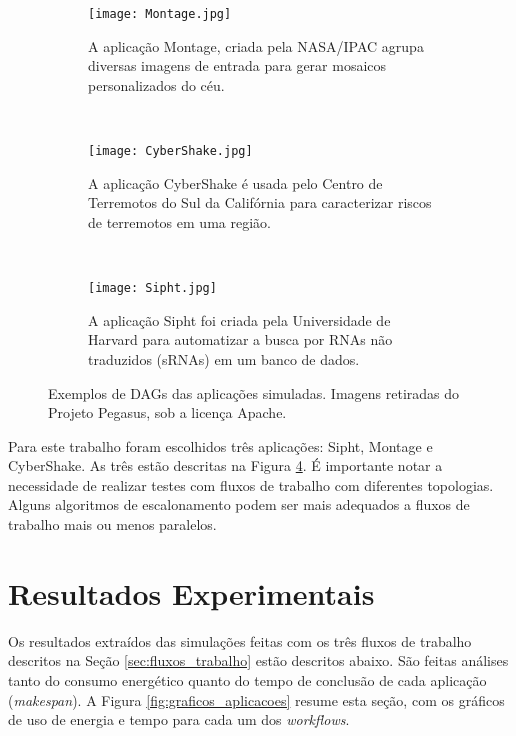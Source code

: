 \begin{figure}
        \centering
        \begin{subfigure}[b]{0.3\textwidth}
                \texttt{[image: Montage.jpg]}
                \caption{A aplicação Montage, criada pela NASA/IPAC agrupa
                diversas imagens de entrada para gerar mosaicos personalizados
                do céu.}
                \label{fig:montage}
        \end{subfigure}%
        ~ %
        \begin{subfigure}[b]{0.3\textwidth}
                \texttt{[image: CyberShake.jpg]}
                \caption{A aplicação CyberShake é usada pelo Centro de Terremotos
                do Sul da Califórnia para caracterizar riscos de terremotos em uma
                região.}
                \label{fig:cybershake}
        \end{subfigure}
        ~
        \begin{subfigure}[b]{0.3\textwidth}
                \texttt{[image: Sipht.jpg]}
                \caption{A aplicação Sipht foi criada pela Universidade de
                Harvard para automatizar a busca por RNAs não traduzidos (sRNAs)
                em um banco de dados.}
                \label{fig:sipht}
        \end{subfigure}%
        \caption{Exemplos de DAGs das aplicações simuladas. Imagens retiradas
        do Projeto Pegasus, sob a licença Apache.}
        \label{fig:dags_aplicacoes}
\end{figure}


Para este trabalho foram escolhidos três aplicações: Sipht, Montage e CyberShake.
As três estão descritas na Figura \ref{fig:dags_aplicacoes}. É
importante notar a necessidade de realizar testes com fluxos de trabalho com
diferentes topologias. Alguns algoritmos de escalonamento podem ser mais
adequados a fluxos de trabalho mais ou menos paralelos.



\section{Resultados Experimentais}
\label{sec:resultados_experimentais}

Os resultados extraídos das simulações feitas com os três fluxos de trabalho
descritos na Seção \ref{sec:fluxos_trabalho} estão descritos abaixo. São feitas
análises tanto do consumo energético quanto do tempo de conclusão de cada
aplicação (\emph{makespan}). A Figura \ref{fig:graficos_aplicacoes} resume esta
seção, com os gráficos de uso de energia e tempo para cada um dos
\emph{workflows}.


